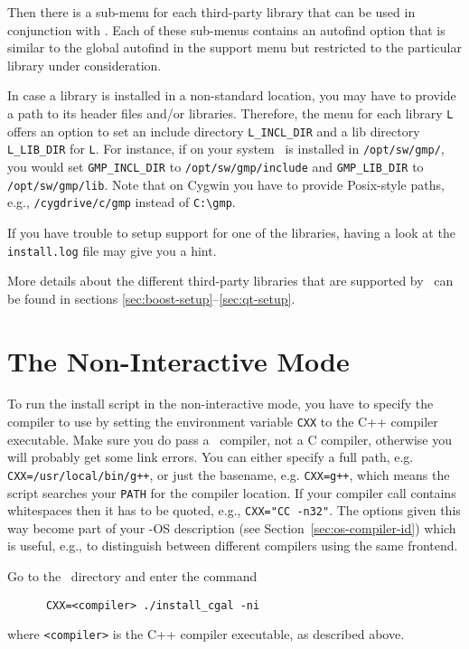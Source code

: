 Then there is a sub-menu for each third-party library that can be used
in conjunction with \cgal. Each of these sub-menus contains an
autofind option that is similar to the global autofind in the support
menu but restricted to the particular library under consideration.

In case a library is installed in a non-standard location, you may
have to provide a path to its header files and/or libraries.
Therefore, the menu for each library \texttt{L} offers an option to
set an include directory \texttt{L\_INCL\_DIR} and a lib directory
\texttt{L\_LIB\_DIR} for \texttt{L}. For instance, if on your system
\gmp\ is installed in \texttt{/opt/sw/gmp/}, you would set
\texttt{GMP\_INCL\_DIR} to \texttt{/opt/sw/gmp/include} and
\texttt{GMP\_LIB\_DIR} to \texttt{/opt/sw/gmp/lib}. Note that on
Cygwin you have to provide Posix-style paths, e.g.,
\texttt{/cygdrive/c/gmp} instead of \verb|C:\gmp|.

If you have trouble to setup support for one of the libraries, having
a look at the \texttt{install.log} file may give you a hint.

More details about the different third-party libraries that are
supported by \cgal\ can be found in sections
\ref{sec:boost-setup}--\ref{sec:qt-setup}.

\section{The Non-Interactive Mode\label{sec:non-interactive}}

To run the install script in the non-interactive mode, you have to
specify the compiler to use by setting the environment variable
\texttt{CXX} to the C++ compiler executable.
Make sure you do pass a \CC\ compiler, not a C compiler, otherwise
you will probably get some link errors.
You can either specify a full path, e.g.
\texttt{CXX=/usr/local/bin/g++}, or just the basename, e.g.
\texttt{CXX=g++}, which means the script searches your \texttt{PATH}
for the compiler location. If your compiler call contains whitespaces
then it has to be quoted, e.g., \texttt{CXX="CC -n32"}. The options
given this way become part of your \cgal-OS description (see Section~\ref{sec:os-compiler-id}) which is useful,
e.g., to distinguish between different compilers using the same
frontend.

Go to the \cgaldir\ directory and enter the command
\begin{verbatim}
      CXX=<compiler> ./install_cgal -ni
\end{verbatim}
where \texttt{<compiler>} is the C++ compiler executable, as described
above.

